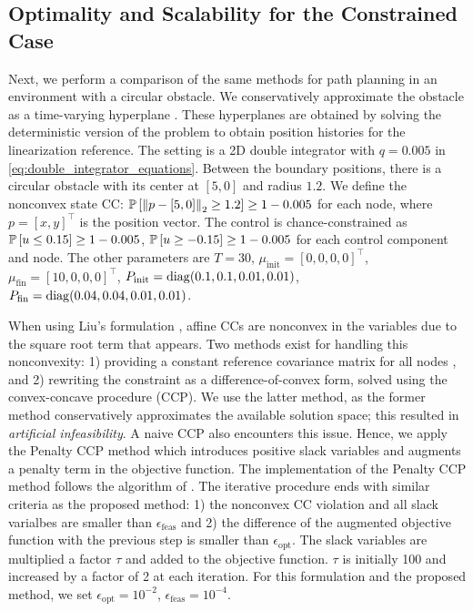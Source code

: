 \subsection{Optimality and Scalability for the Constrained Case}
Next, we perform a comparison of the same methods for path planning in an environment with a circular obstacle. We conservatively approximate the obstacle as a time-varying hyperplane \cite{dicairanoModelPredictiveControl2012}.
These hyperplanes are obtained by solving the deterministic version of the problem to obtain position histories for the linearization reference.
The setting is a 2D double integrator with $q = 0.005$ in \cref{eq:double_integrator_equations}. Between the boundary positions, there is a circular obstacle with its center at $[5, 0]$ and radius $1.2$. We define the nonconvex state CC: $\P{\norm{p - [5, 0]}_2 \geq 1.2} \geq 1 - 0.005$
for each node, where $p = [x, y]^\top$ is the position vector.
The control is chance-constrained as $\P{u \leq 0.15} \geq 1 - 0.005$, $\P{u \geq -0.15} \geq 1 - 0.005$
for each control component and node. The other parameters are $T = 30$, $ \mu_{\mathrm{init}} = [0, 0, 0, 0]^\top$, $ \mu_{\mathrm{fin}} = [10, 0, 0, 0]^\top$, $P_{\mathrm{init}} =\diag{0.1, 0.1, 0.01, 0.01}$, $P_{\mathrm{fin}} = \diag{0.04, 0.04, 0.01, 0.01}$.

When using Liu's formulation \cite{liuOptimalCovarianceSteering2025}, affine CCs are nonconvex in the variables due to the square root term that appears. Two methods exist for handling this nonconvexity: 1) providing a constant reference covariance matrix for all nodes \cite{rapakouliasDiscreteTimeOptimalCovariance2023}, and 2) rewriting the constraint as a difference-of-convex form, solved using the convex-concave procedure (CCP)\cite{pilipovskyComputationallyEfficientChance2024}. We use the latter method, as the former method conservatively approximates the available solution space; this resulted in \textit{artificial infeasibility}. A naive CCP also encounters this issue. Hence, we apply the Penalty CCP method \cite{lippVariationsExtensionConvex2016} which introduces positive slack variables and augments a penalty term in the objective function. The implementation of the Penalty CCP method follows the algorithm of \cite{lippVariationsExtensionConvex2016}. The iterative procedure ends with similar criteria as the proposed method: 1) the nonconvex CC violation and all slack varialbes are smaller than $\epsilon_{\mathrm{feas}}$ and 2) the difference of the augmented objective function with the previous step is smaller than $\epsilon_{\mathrm{opt}}$. The slack variables are multiplied a factor $\tau$ and added to the objective function. $\tau$ is initially 100 and increased by a factor of 2 at each iteration. For this formulation and the proposed method, we set $\epsilon_{\mathrm{opt}} = 10^{-2}$, $\epsilon_{\mathrm{feas}} = 10^{-4}$. 

